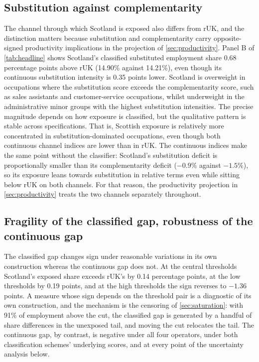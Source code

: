 \subsection{Substitution against complementarity}\label{sec:channels}
 
The channel through which Scotland is exposed also differs from rUK, and the distinction matters because substitution and complementarity carry opposite-signed productivity implications in the projection of \cref{sec:productivity}. Panel B of \cref{tab:headline} shows Scotland's classified substituted employment share 0.68 percentage points above rUK (14.90\% against 14.21\%), even though its continuous substitution intensity is 0.35 points lower. Scotland is overweight in occupations where the substitution score exceeds the complementarity score, such as sales assistants and customer-service occupations, whilst underweight in the administrative minor groups with the highest substitution intensities. The precise magnitude depends on how exposure is classified, but the qualitative pattern is stable across specifications. That is, Scottish exposure is relatively more concentrated in substitution-dominated occupations, even though both continuous channel indices are lower than in rUK. The continuous indices make the same point without the classifier: Scotland's substitution deficit is proportionally smaller than its complementarity deficit ($-0.9\%$ against $-1.5\%$), so its exposure leans towards substitution in relative terms even while sitting below rUK on both channels. For that reason, the productivity projection in \cref{sec:productivity} treats the two channels separately throughout.
 
\subsection{Fragility of the classified gap, robustness of the continuous gap}\label{sec:fragility}
 
The classified gap changes sign under reasonable variations in its own construction whereas the continuous gap does not. At the central thresholds Scotland's exposed share exceeds rUK's by 0.14 percentage points, at the low thresholds by 0.19 points, and at the high thresholds the sign reverses to $-1.36$ points. A measure whose sign depends on the threshold pair is a diagnostic of its own construction, and the mechanism is the censoring of \cref{sec:saturation}: with 91\% of employment above the cut, the classified gap is generated by a handful of share differences in the unexposed tail, and moving the cut relocates the tail. The continuous gap, by contrast, is negative under all four operators, under both classification schemes' underlying scores, and at every point of the uncertainty analysis below.
 
